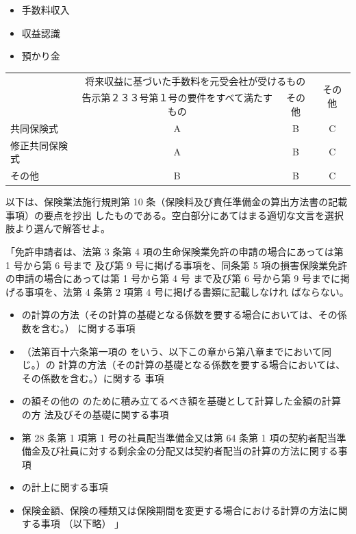 \documentclass[report,gutter=10mm,fore-edge=10mm,uplatex,dvipdfmx]{jlreq}
\begin{document}
\begin{itemize}
\item[ ①: ] 手数料収入
\item[ ②: ] 収益認識
\item[ ③: ] 預かり金
\end{itemize}

\begin{tabular}{|l|c|c|c|}
 \hline
\multirow{2}{*}{}& \multicolumn{2}{c|}{将来収益に基づいた手数料を元受会社が受けるもの}
 &\multirow{2}{*}{その他}\\  \cline{2-3}
&告示第２３３号第１号の要件をすべて満たすもの&その他&\\ \hline
共同保険式  & A&B &C \\ \hline
修正共同保険式 &A &B & C \\ \hline
その他 & B & B & C\\ \hline
\end{tabular}

以下は、保険業法施行規則第 10 条（保険料及び責任準備金の算出方法書の記載事項）の要点を抄出
したものである。空白部分にあてはまる適切な文言を選択肢より選んで解答せよ。

「免許申請者は、法第 3 条第 4 項の生命保険業免許の申請の場合にあっては第 1 号から第 6 号まで
及び第 9 号に掲げる事項を、同条第 5 項の損害保険業免許の申請の場合にあっては第 1 号から第 4 号
まで及び第 6 号から第 9 号までに掲げる事項を、法第 4 条第 2 項第 4 号に掲げる書類に記載しなけれ
ばならない。

\begin{itemize}
\item[ 一]   の計算の方法（その計算の基礎となる係数を要する場合においては、その係数を含む。） に関する事項
\item[ 二]   （法第百十六条第一項の  をいう、以下この章から第八章までにおいて同じ。）の 計算の方法（その計算の基礎となる係数を要する場合においては、その係数を含む。）に関する 事項
\item[ 三]   の額その他の  のために積み立てるべき額を基礎として計算した金額の計算の方 法及びその基礎に関する事項
\item[ 四]  第 28 条第 1 項第 1 号の社員配当準備金又は第 64 条第 1 項の契約者配当準備金及び社員に対する剰余金の分配又は契約者配当の計算の方法に関する事項
\item[ 五]   の計上に関する事項
\item[ 六]  保険金額、保険の種類又は保険期間を変更する場合における計算の方法に関する事項
 （以下略） 」
\end{itemize}
\end{document}
